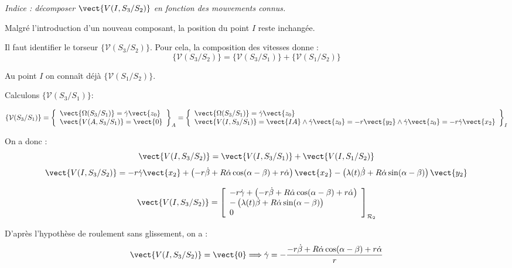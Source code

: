 \textit{Indice : décomposer $\vect{V(I,S_3/S_2)}$ en fonction des mouvements connus.}
\ifprof
\begin{corrige}

Malgré l'introduction d'un nouveau composant, la position du point $I$ reste inchangée.

Il faut identifier le torseur $\{\mathcal{V}(S_3/S_2)\}$. 
Pour cela, la composition des vitesses donne :
$$
\{\mathcal{V}(S_3/S_2)\} = \{\mathcal{V}(S_3/S_1)\} + \{\mathcal{V}(S_1/S_2)\}  
$$


Au point $I$ on connaît déjà $\{\mathcal{V}(S_1/S_2)\}$.

Calculons $\{\mathcal{V}(S_3/S_1)\}$:

$$
\{\mathcal{V}(S_3/S_1)\}
= 
\left\{
\begin{array}{l}
\vect{\Omega(S_3/S_1)} = \dot{\gamma}\vect{z_0} \\
\vect{V(A,S_3/S_1)} = \vect{0}
\end{array}
\right\}_A =
\left\{
\begin{array}{l}
\vect{\Omega(S_3/S_1)} = \dot{\gamma}\vect{z_0} \\
\vect{V(I,S_3/S_1)} = \vect{IA} \wedge \dot{\gamma}\vect{z_0}
= -r\vect{y_2} \wedge \dot{\gamma}\vect{z_0} = -r \dot{\gamma}\vect{x_2}
\end{array}
\right\}_I
$$

On a donc :
$$
\vect{V(I,S_3/S_2)} = \vect{V(I,S_3/S_1)} + \vect{V(I,S_1/S_2)} 
$$
$$
\vect{V(I,S_3/S_2)} = -r \dot{\gamma}\vect{x_2} 
+\left(-r\dot{\beta}+ R\dot{\alpha}\cos(\alpha-\beta) + r\dot{\alpha}\right)\vect{x_2}
- \left(\lambda(t) \dot{\beta}+  R\dot{\alpha}\sin(\alpha-\beta)\right)\vect{y_2}
$$


$$
\vect{V(I,S_3/S_2)} =\left[ 
\begin{array}{l}
 -r \dot{\gamma}+\left(-r\dot{\beta}+ R\dot{\alpha}\cos(\alpha-\beta) + r\dot{\alpha}\right)\\
- \left(\lambda(t) \dot{\beta}+  R\dot{\alpha}\sin(\alpha-\beta)\right)\\
0\\
\end{array}
\right]_{\mathcal{R}_2}  
$$



D'après l'hypothèse de roulement sans glissement, on a :
$$ 
\vect{V(I,S_3/S_2)} = \vect{0} \Longrightarrow  \dot{\gamma}=-\dfrac{-r\dot{\beta}+ R\dot{\alpha}\cos(\alpha-\beta) + r\dot{\alpha}}{r}
$$

\end{corrige}
\else\fi


